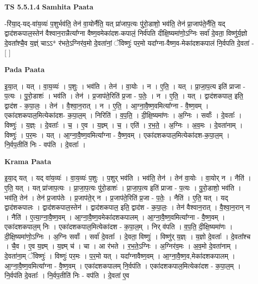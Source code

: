 \documentclass[17pt]{extarticle}
\begin{document}
\textbf{TS 5.5.1.4 } \newline
\textbf{Samhita Paata} \newline

-रि॑या॒द्-यद्-वा॑य॒व्यः॑ प॒शुर्भव॑ति॒ तेन॑ वा॒योर्नैति॒ यत् प्रा॑जाप॒त्यः पु॑रो॒डाशो॒ भव॑ति॒ तेन॑ प्रा॒जाप॑ते॒र्नैति॒ यद् द्वाद॑शकपाल॒स्तेन॑ वैश्वान॒रान्नैत्या᳚ग्ना वैष्ण॒वमेका॑दश-कपालं॒ निर्व॑पति दीक्षि॒ष्यमा॑णो॒ऽग्निः सर्वा॑ दे॒वता॒ विष्णु॑र्य॒ज्ञो दे॒वता᳚श्चै॒व य॒ज्ञ्ं चाऽऽ* र॑भते॒ऽग्निर॑व॒मो दे॒वता॑नां॒ ॅविष्णुः॑ पर॒मो यदा᳚ग्ना-वैष्ण॒व-मेका॑दशकपालं नि॒र्वपति दे॒वता॑ - [  ] \newline

\textbf{Pada Paata} \newline

इ॒या॒त् । यत् । वा॒य॒व्यः॑ । प॒शुः । भव॑ति । तेन॑ । वा॒योः । न । ए॒ति॒ । यत् । प्रा॒जा॒प॒त्य इति॑ प्राजा - प॒त्यः । पु॒रो॒डाशः॑ । भव॑ति । तेन॑ । प्र॒जाप॑ते॒रिति॑ प्र॒जा - प॒तेः॒ । न । ए॒ति॒ । यत् । द्वाद॑शकपाल॒ इति॒ द्वाद॑श - क॒पा॒लः॒ । तेन॑ । वै॒श्वा॒न॒रात् । न । ए॒ति॒ । आ॒ग्ना॒वै॒ष्ण॒वमित्या᳚ग्ना - वै॒ष्ण॒वम् । एका॑दशकपाल॒मित्येका॑दश- क॒पा॒ल॒म् । निरिति॑ । व॒प॒ति॒ । दी॒क्षि॒ष्यमा॑णः । अ॒ग्निः । सर्वाः᳚ । दे॒वताः᳚ । विष्णुः॑ । य॒ज्ञ्ः । दे॒वताः᳚ । च॒ । ए॒व । य॒ज्ञ्म् । च॒ । एति॑ । र॒भ॒ते॒ । अ॒ग्निः । अ॒व॒मः । दे॒वता॑नाम् । विष्णुः॑ । प॒र॒मः । यत् । आ॒ग्ना॒वै॒ष्ण॒वमित्या᳚ग्ना - वै॒ष्ण॒वम् । एका॑दशकपाल॒मित्येका॑दश-क॒पा॒ल॒म् । नि॒र्वप॒तीति॑ निः - वप॑ति । दे॒वताः᳚ ।  \newline


\textbf{Krama Paata} \newline

इ॒या॒द् यत् । यद् वा॑य॒व्यः॑ । वा॒य॒व्यः॑ प॒शुः । प॒शुर् भव॑ति । भव॑ति॒ तेन॑ । तेन॑ वा॒योः । वा॒योर् न । नैति॑ । ए॒ति॒ यत् । यत् प्रा॑जाप॒त्यः । प्रा॒जा॒प॒त्यः पु॑रो॒डाशः॑ । प्रा॒जा॒प॒त्य इति॑ प्राजा - प॒त्यः । पु॒रो॒डाशो॒ भव॑ति । भव॑ति॒ तेन॑ । तेन॑ प्र॒जाप॑तेः । प्र॒जाप॑ते॒र् न । प्र॒जाप॑ते॒रिति॑ प्र॒जा - प॒तेः॒ । नैति॑ । ए॒ति॒ यत् । यद् द्वाद॑शकपालः । द्वाद॑शकपाल॒स्तेन॑ । द्वाद॑शकपाल॒ इति॒ द्वाद॑श - क॒पा॒लः॒ । तेन॑ वैश्वान॒रात् । वै॒श्वा॒न॒रान् न । नैति॑ । ए॒त्या॒ग्ना॒वै॒ष्ण॒वम् । आ॒ग्ना॒वै॒ष्ण॒वमेका॑दशकपालम् । आ॒ग्ना॒वै॒ष्ण॒वमित्या᳚ग्ना - वै॒ष्ण॒वम् । एका॑दशकपाल॒म् निः । एका॑दशकपाल॒मित्येका॑दश - क॒पा॒ल॒म् । निर् व॑पति । व॒प॒ति॒ दी॒क्षि॒ष्यमा॑णः । दी॒क्षि॒ष्यमा॑णो॒ऽग्निः । अ॒ग्निः सर्वाः᳚ । सर्वा॑ दे॒वताः᳚ । दे॒वता॒ विष्णुः॑ । विष्णु॑र् य॒ज्ञ्ः । य॒ज्ञो दे॒वताः᳚ । दे॒वता᳚श्च । चै॒व । ए॒व य॒ज्ञ्म् । य॒ज्ञ्म् च॑ । चा । आ र॑भते । र॒भ॒ते॒ऽग्निः । अ॒ग्निर॑व॒मः । अ॒व॒मो दे॒वता॑नाम् । दे॒वता॑ना॒म् ॅविष्णुः॑ । विष्णुः॑ पर॒मः । प॒र॒मो यत् । यदा᳚ग्नावैष्ण॒वम् । आ॒ग्ना॒वै॒ष्ण॒व,मेका॑दशकपालम् । आ॒ग्ना॒वै॒ष्ण॒वमित्या᳚ग्ना - वै॒ष्ण॒वम् । एका॑दशकपालम् नि॒र्वप॑ति । एका॑दशकपाल॒मित्येका॑दश - क॒पा॒ल॒म् । नि॒र्वप॑ति दे॒वताः᳚ । नि॒र्वप॒तीति॑ निः - वप॑ति । दे॒वता॑ ए॒व \newline
\end{document}
